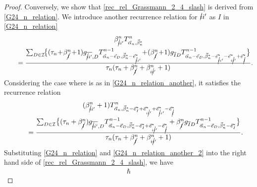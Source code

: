 \documentclass[10pt,a4paper]{amsart}
\numberwithin{equation}{section}
\begin{document}
\begin{proof}
Conversely, we show that \eqref{rec_rel_Grassmann_2_4_slash} is derived from \eqref{G24_n_relation}. We introduce another recurrence relation for $\cancel{i}i'$ as $I$ in \eqref{G24_n_relation}
\begin{gather}
 \beta_{\cancel{i}i'}^{n}
 T^{n}_{\vec{\alpha}_{n},\vec{\beta}_{n}^{\ast}}\nonumber
 \\
 \qquad=
 \frac{
 \sum_{
 D
 \in
 \mathcal{I}
 }\!
 \bigl\{
 (
 \tau_{n}\!
 +\!
 \beta_{\cancel{I}}^{n}\!
 +\!
 1
 )
 g_{\overline{\cancel{i}i'},D}
 T^{n-1}_{
 \vec{\alpha}_{n}
 -
 \vec{e}_{D},
 \vec{\beta}_{n}^{\ast}
 -
 \vec{e}_{\cancel{i}i'}^{\ast}
 }\!
 +\!
 (
 \beta_{\cancel{I}}^{n}\!
 +\!
 1
 )
 g_{\overline{I}D}
 T^{n-1}_{
 \vec{\alpha}_{n}
 -
 \vec{e}_{D},
 \vec{\beta}_{n}^{\ast}
 -
 \vec{e}_{\cancel{i}i'}^{\ast}
 -
 \vec{e}_{i\cancel{i}'}^{\ast}
 +
 \vec{e}_{\cancel{I}}^{\ast}
 }
 \bigr\}
 }{
 \tau_{n}
 (
 \tau_{n}
 +
 \beta_{\cancel{I}}^{n}
 +
 \beta_{i\cancel{i}'}^{n}
 +
 1
 )
 }
 .
\label{G24_n_relation_another}
\end{gather}
Considering the case where
is
as
in \eqref{G24_n_relation_another}, it satisfies the recurrence relation
\begin{gather}
 (
 \beta_{\cancel{i}i'}^{n}
 +
 1
 )
 T^{n}_{
 \vec{\alpha}_{n},
 \vec{\beta}_{n}^{\ast}
 -
 \vec{e}_{I}^{\ast}
 +
 \vec{e}_{i\cancel{i}'}^{\ast}
 +
 \vec{e}_{\cancel{i}i'}^{\ast}
 -
 \vec{e}_{\cancel{I}}^{\ast}
 }\nonumber\\
 \qquad
 =
 \frac{
 \sum_{
 D
 \in
 \mathcal{I}
 }
 \bigl\{
 (
 \tau_{n}
 +
 \beta_{\cancel{I}}^{n}
 )
 g_{\overline{\cancel{i}i'},D}
 T^{n-1}_{
 \vec{\alpha}_{n}
 -
 \vec{e}_{D},
 \vec{\beta}_{n}^{\ast}
 -
 \vec{e}_{I}^{\ast}
 +
 \vec{e}_{i\cancel{i}'}^{\ast}
 -
 \vec{e}_{\cancel{I}}^{\ast}
 }
 +
 \beta_{\cancel{I}}^{n}
 g_{\overline{I}D}
 T^{n-1}_{
 \vec{\alpha}_{n}
 -
 \vec{e}_{D},
 \vec{\beta}_{n}^{\ast}
 -
 \vec{e}_{I}^{\ast}
 }
 \bigr\}
 }{
 \tau_{n}
 (
 \tau_{n}
 +
 \beta_{\cancel{I}}^{n}
 +
 \beta_{i\cancel{i}'}^{n}
 +
 1
 )
 }
 .
\label{G24_n_relation_another_2}
\end{gather}
Substituting \eqref{G24_n_relation} and \eqref{G24_n_relation_another_2} into the right hand side of \eqref{rec_rel_Grassmann_2_4_slash}, we have
\begin{gather*}%
 \hbar

\end{gather*}
\end{proof}
\end{document}
